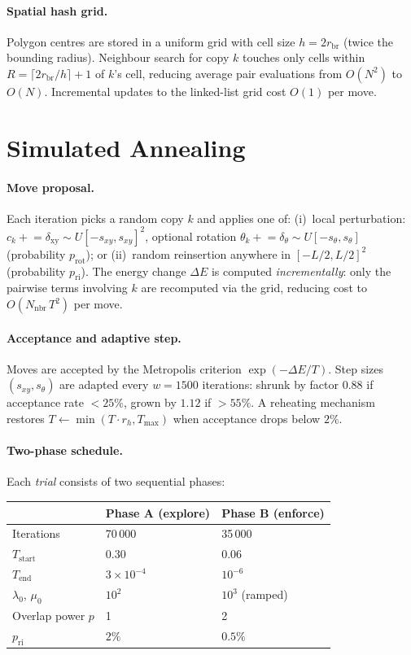 \documentclass[10pt,twocolumn]{article}
\begin{document}
\paragraph{Spatial hash grid.}
Polygon centres are stored in a uniform grid with cell size
$h = 2r_{\mathrm{br}}$ (twice the bounding radius).
Neighbour search for copy $k$ touches only cells within
$R = \lceil 2r_{\mathrm{br}}/h \rceil + 1$ of $k$'s cell,
reducing average pair evaluations from $O(N^2)$ to $O(N)$.
Incremental updates to the linked-list grid cost $O(1)$ per move.

\section{Simulated Annealing}
\label{sec:sa}

\paragraph{Move proposal.}
Each iteration picks a random copy $k$ and applies one of:
(i)~local perturbation: $c_k \mathrel{+}= \delta_{\mathrm{xy}}\sim U[-s_{xy},s_{xy}]^2$,
optional rotation $\theta_k \mathrel{+}= \delta_\theta\sim U[-s_\theta,s_\theta]$
(probability $p_{\mathrm{rot}}$); or
(ii)~random reinsertion anywhere in $[-L/2,L/2]^2$
(probability $p_{\mathrm{ri}}$).
The energy change $\Delta E$ is computed \emph{incrementally}: only the
pairwise terms involving $k$ are recomputed via the grid, reducing cost to
$O(N_{\mathrm{nbr}}\,T^2)$ per move.

\paragraph{Acceptance and adaptive step.}
Moves are accepted by the Metropolis criterion $\exp(-\Delta E/T)$.
Step sizes $(s_{xy},s_\theta)$ are adapted every $w=1500$ iterations:
shrunk by factor $0.88$ if acceptance rate $<25\%$, grown by $1.12$ if
$>55\%$.  A reheating mechanism restores $T\leftarrow\min(T\cdot r_h,T_{\max})$
when acceptance drops below $2\%$.

\paragraph{Two-phase schedule.}
Each \emph{trial} consists of two sequential phases:

\smallskip
\begin{tabular}{lll}
\toprule
& Phase A (explore) & Phase B (enforce) \\
\midrule
Iterations    & 70\,000  & 35\,000 \\
$T_{\mathrm{start}}$ & $0.30$  & $0.06$ \\
$T_{\mathrm{end}}$   & $3\times10^{-4}$ & $10^{-6}$ \\
$\lambda_0$, $\mu_0$ & $10^{2}$ & $10^{3}$ (ramped) \\
Overlap power $p$ & 1 & 2 \\
$p_{\mathrm{ri}}$     & $2\%$ & $0.5\%$ \\
\bottomrule
\end{tabular}
\smallskip
\end{document}
